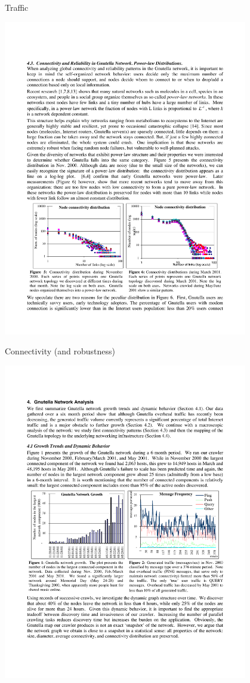 \begin{frame}{Traffic}
	
\includegraphics[width=0.8\textwidth]{figs/10/mapping2}	

\end{frame}

\begin{frame}{Connectivity (and robustness)}
	
\includegraphics[width=0.8\textwidth]{figs/10/mapping1}

\end{frame}

